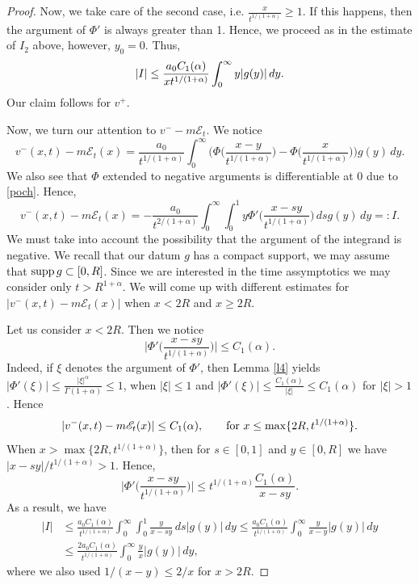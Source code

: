\documentclass[10pt,a4paper]{amsart}
\def\sE{{\mathscr{E}}}
\def\supp{\hbox{supp}\, }
\begin{document}
\begin{proof}
Now, we take care of the second case, i.e. $\frac{x}{t^{1/(1+\alpha)}} \ge 1$. If this happens, then the argument of $\Phi'$ is always greater than 1. Hence, we proceed as in the estimate of $I_2$ above, however, $y_0=0$. Thus,
$$
|I| \le \frac{a_0 C_1(\alpha)}{%
xt^{1/(1+\alpha)}} \int_{0}^\infty y |g(y)|\, dy.
$$
Our claim follows for $v^+$.


Now, we turn our attention to $v^- -m\sE_t$. We notice
$$
v^-(x,t) - m\sE_t (x)= \frac{a_0}{t^{1/(1+\alpha)}}\int_0^\infty
\bigg(\Phi\bigg( \frac{x- y}{t^{1/(1+\alpha)}}\bigg)
-\Phi\bigg( \frac{x}{t^{1/(1+\alpha)}}\bigg)\bigg)g(y)\,dy.
$$
We also see that $\Phi$ extended to negative arguments is differentiable at $0$ due to \eqref{poch}. Hence,
$$
v^-(x,t) - m\sE_t(x) = -\frac{a_0}{t^{2/(1+\alpha)}}\int_0^\infty
\int_0^1 y \Phi'\bigg(\frac{x-sy}{t^{1/(1+\alpha)}}\bigg)\,ds g(y)\, dy=:I.
$$
We must take into account the possibility that  the argument of the integrand  is negative. We recall that our datum $g$ has a compact support, we may assume that $\supp g\subset[0,R]$. Since we are interested in the time assymptotics we may consider only $t> R^{1+\alpha}.$
We will come up with different estimates for $|v^-(x,t)-m \sE_t(x)|$ when $x<2R$ and $x\ge 2R$.

Let us consider $x<2R$. Then we notice
$$
\bigg| \Phi'\bigg(\frac{x-sy}{t^{1/(1+\alpha)}}\bigg)\bigg|\le C_1(\alpha).
$$
Indeed, if $\xi$ denotes the argument of $\Phi'$, then
Lemma \ref{l4} yields $|\Phi'(\xi)| \le \frac{|\xi|^\alpha}{\Gamma(1+\alpha)}\le 1$, when  $|\xi|\le 1$ and $|\Phi'(\xi)| \le \frac {C_1(\alpha)}{|\xi|}\le C_1(\alpha)$ for $|\xi|>1$. Hence
$$
|v^-(x,t)-  m \sE_t(x)|\le C_1(\alpha), \qquad\hbox{for }x\le \max\{2R, t^{1/(1+\alpha)}\}.
$$
When $x>\max\{2R, t^{1/(1+\alpha)}\}$, then for $s\in [0,1]$ and $y\in[0,R]$ we have
$|x-sy|/t^{1/(1+\alpha)}>1$. Hence,
$$
\bigg| \Phi'\bigg(\frac{x-sy}{t^{1/(1+\alpha)}}\bigg)\bigg|\le
t^{1/(1+\alpha)} \frac {C_1(\alpha)}{x-sy}.
$$
As a result, we have
\begin{align*}
|I| & \le  \frac{a_0 C_1(\alpha)}{t^{1/(1+\alpha)}}\int_0^\infty
\int_0^1  \frac y{x-sy}\,ds |g(y)|\, dy
\le    
\frac{a_0 C_1(\alpha)}{t^{1/(1+\alpha)}}\int_0^\infty \frac y{x-y} |g(y)|\,dy \\ &
\le  \frac{ 2a_0 C_1(\alpha)}{t^{1/(1+\alpha)}}\int_0^\infty \frac y{x} |g(y)|\,dy ,
\end{align*}
where we also used $1/(x-y) \le 2/x$ for $x> 2R.$
\end{proof}
\end{document}
